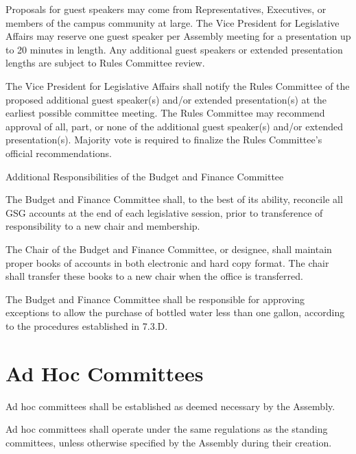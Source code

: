 \begin{bylaws-number}
\begin{bylaws-number}
    \begin{bylaws-number}
    	\item Proposals for guest speakers may come from Representatives, Executives, or members of the campus community at large. The Vice President for Legislative Affairs may reserve one guest speaker per Assembly meeting for a presentation up to 20 minutes in length. Any additional guest speakers or extended presentation lengths are subject to Rules Committee review.
    	\item The Vice President for Legislative Affairs shall notify the Rules Committee of the proposed additional guest speaker(s) and/or extended presentation(s) at the earliest possible committee meeting. The Rules Committee may recommend approval of all, part, or none of the additional guest speaker(s) and/or extended presentation(s). Majority vote is required to finalize the Rules Committee’s official recommendations.
   	\end{bylaws-number}
  \end{bylaws-number}
  \item Additional Responsibilities of the Budget and Finance Committee
  \begin{bylaws-number}
    \item The Budget and Finance Committee shall, to the best of its ability, reconcile all GSG accounts at the end of each legislative session, prior to transference of responsibility to a new chair and membership.
    \item The Chair of the Budget and Finance Committee, or designee, shall maintain proper books of accounts in both electronic and hard copy format. The chair shall transfer these books to a new chair when the office is transferred.
    \item The Budget and Finance Committee shall be responsible for approving exceptions to allow the purchase of bottled water less than one gallon, according to the procedures established in 7.3.D.
  \end{bylaws-number}
\end{bylaws-number}

\section{Ad Hoc Committees}
\begin{bylaws-number}
  \item Ad hoc committees shall be established as deemed necessary by the Assembly.
  \item Ad hoc committees shall operate under the same regulations as the standing committees, unless otherwise specified by the Assembly during their creation.
\end{bylaws-number}
